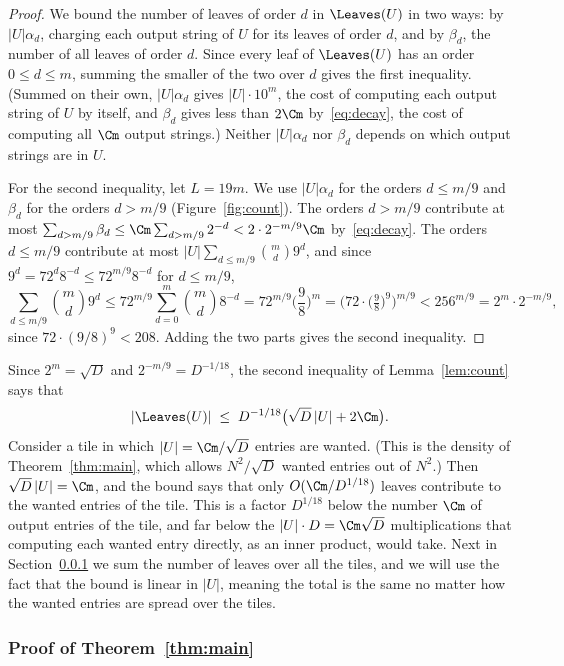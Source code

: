 \begin{proof}
We bound the number of leaves of order $d$ in $\Leaves(U)$ in two ways: by $|U|\alpha_d$, charging each output string of $U$ for its leaves of order $d$, and by $\beta_d$, the number of all leaves of order $d$. Since every leaf of $\Leaves(U)$ has an order $0\le d\le m$, summing the smaller of the two over $d$ gives the first inequality. (Summed on their own, $|U|\alpha_d$ gives $|U|\cdot10^m$, the cost of computing each output string of $U$ by itself, and $\beta_d$ gives less than $2\Cm$ by~\eqref{eq:decay}, the cost of computing all $\Cm$ output strings.) Neither $|U|\alpha_d$ nor $\beta_d$ depends on which output strings are in $U$.

For the second inequality, let $L=19m$. We use $|U|\alpha_d$ for the orders $d\le m/9$ and $\beta_d$ for the orders $d>m/9$ (Figure~\ref{fig:count}). The orders $d>m/9$ contribute at most $\sum_{d>m/9}\beta_d\le\Cm\sum_{d>m/9}2^{-d}<2\cdot2^{-m/9}\Cm$ by~\eqref{eq:decay}. The orders $d\le m/9$ contribute at most $|U|\sum_{d\le m/9}\binom md9^d$, and since $9^d=72^d8^{-d}\le72^{m/9}8^{-d}$ for $d\le m/9$,
\[
\sum_{d\le m/9}\binom md9^d\le72^{m/9}\sum_{d=0}^{m}\binom md8^{-d}=72^{m/9}\Big(\frac98\Big)^m=\Big(72\cdot\big(\tfrac98\big)^9\Big)^{m/9}<256^{m/9}=2^m\cdot2^{-m/9},
\]
since $72\cdot(9/8)^9<208$. Adding the two parts gives the second inequality.
\end{proof}

Since $2^m=\sqrt D$ and $2^{-m/9}=D^{-1/18}$, the second inequality of Lemma~\ref{lem:count} says that
\[
|\Leaves(U)|\;\le\;D^{-1/18}\big(\sqrt D\,|U|+2\Cm\big).
\]
Consider a tile in which $|U|=\Cm/\sqrt D$ entries are wanted. (This is the density of Theorem~\ref{thm:main}, which allows $N^2/\sqrt D$ wanted entries out of $N^2$.) Then $\sqrt D\,|U|=\Cm$, and the bound says that only $O(\Cm/D^{1/18})$ leaves contribute to the wanted entries of the tile. This is a factor $D^{1/18}$ below the number $\Cm$ of output entries of the tile, and far below the $|U|\cdot D=\Cm\sqrt D$ multiplications that computing each wanted entry directly, as an inner product, would take. Next in Section~\ref{sec:proof} we sum the number of leaves over all the tiles, and we will use the fact that the bound is linear in $|U|$, meaning the total is the same no matter how the wanted entries are spread over the tiles.

\subsubsection{Proof of Theorem~\ref{thm:main}}\label{sec:proof}

